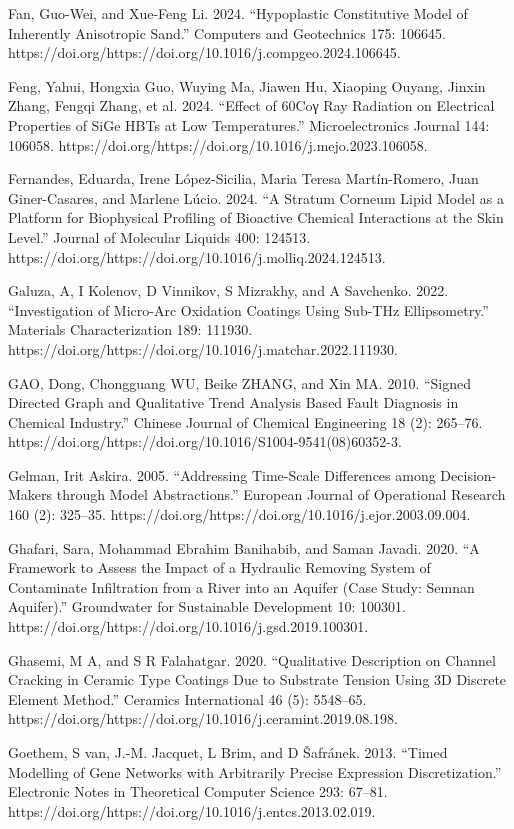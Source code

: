 \documentclass[utf8]{gradu3}
\begin{document}
Fan, Guo-Wei, and Xue-Feng Li. 2024. “Hypoplastic Constitutive Model of Inherently Anisotropic Sand.” Computers and Geotechnics 175: 106645. https://doi.org/https://doi.org/10.1016/j.compgeo.2024.106645.

Feng, Yahui, Hongxia Guo, Wuying Ma, Jiawen Hu, Xiaoping Ouyang, Jinxin Zhang, Fengqi Zhang, et al. 2024. “Effect of 60Coγ Ray Radiation on Electrical Properties of SiGe HBTs at Low Temperatures.” Microelectronics Journal 144: 106058. https://doi.org/https://doi.org/10.1016/j.mejo.2023.106058.

Fernandes, Eduarda, Irene López-Sicilia, Maria Teresa Martín-Romero, Juan Giner-Casares, and Marlene Lúcio. 2024. “A Stratum Corneum Lipid Model as a Platform for Biophysical Profiling of Bioactive Chemical Interactions at the Skin Level.” Journal of Molecular Liquids 400: 124513. https://doi.org/https://doi.org/10.1016/j.molliq.2024.124513.

Galuza, A, I Kolenov, D Vinnikov, S Mizrakhy, and A Savchenko. 2022. “Investigation of Micro-Arc Oxidation Coatings Using Sub-THz Ellipsometry.” Materials Characterization 189: 111930. https://doi.org/https://doi.org/10.1016/j.matchar.2022.111930.

GAO, Dong, Chongguang WU, Beike ZHANG, and Xin MA. 2010. “Signed Directed Graph and Qualitative Trend Analysis Based Fault Diagnosis in Chemical Industry.” Chinese Journal of Chemical Engineering 18 (2): 265–76. https://doi.org/https://doi.org/10.1016/S1004-9541(08)60352-3.

Gelman, Irit Askira. 2005. “Addressing Time-Scale Differences among Decision-Makers through Model Abstractions.” European Journal of Operational Research 160 (2): 325–35. https://doi.org/https://doi.org/10.1016/j.ejor.2003.09.004.

Ghafari, Sara, Mohammad Ebrahim Banihabib, and Saman Javadi. 2020. “A Framework to Assess the Impact of a Hydraulic Removing System of Contaminate Infiltration from a River into an Aquifer (Case Study: Semnan Aquifer).” Groundwater for Sustainable Development 10: 100301. https://doi.org/https://doi.org/10.1016/j.gsd.2019.100301.

Ghasemi, M A, and S R Falahatgar. 2020. “Qualitative Description on Channel Cracking in Ceramic Type Coatings Due to Substrate Tension Using 3D Discrete Element Method.” Ceramics International 46 (5): 5548–65. https://doi.org/https://doi.org/10.1016/j.ceramint.2019.08.198.

Goethem, S van, J.-M. Jacquet, L Brim, and D Šafránek. 2013. “Timed Modelling of Gene Networks with Arbitrarily Precise Expression Discretization.” Electronic Notes in Theoretical Computer Science 293: 67–81. https://doi.org/https://doi.org/10.1016/j.entcs.2013.02.019.
\end{document}
